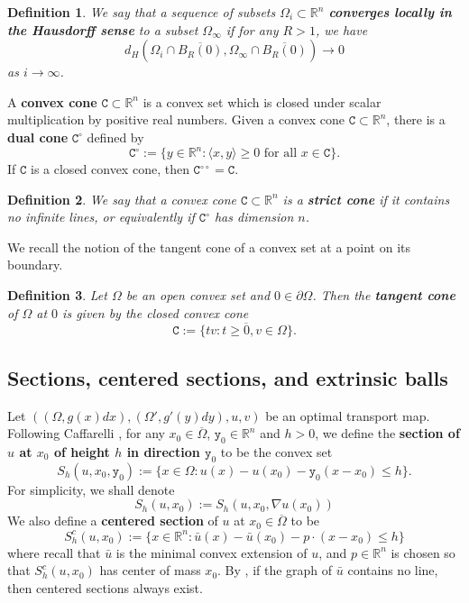 \documentclass[12pt,reqno]{amsart}
\newtheorem{defn}{Definition}[section]
\numberwithin{equation}{section}
\begin{document}
\begin{defn}
    We say that a sequence of subsets $\Omega_i\subset\mathbb R^n$ {\bf converges locally in the Hausdorff sense} to a subset $\Omega_{\infty}$ if for any $R>1$, we have \[d_H(\Omega_i\cap \overline{B_R(0)}, \Omega_\infty\cap \overline{B_R(0)})\to 0\] as $i\to \infty$. 
\end{defn}


A {\bf convex cone} $\mathtt C\subset \mathbb R^n$ is a convex set which is closed under scalar multiplication by positive real numbers. Given a convex cone $\mathtt C\subset \mathbb R^n$, there is a {\bf dual cone} $\mathtt C^{\circ}$ defined by
    \[\mathtt C^{\circ} :=\{y\in \mathbb R^n: \langle x, y\rangle\geq 0\text{ for all }x\in\mathtt C\}. \]
If $\mathtt C$ is a closed convex cone, then $\mathtt C^{\circ \circ} = \mathtt C$. 
\begin{defn}
    We say that a convex cone $\mathtt C\subset \mathbb R^n$ is a {\bf strict cone} if it contains no infinite lines, or equivalently if $\mathtt C^{\circ}$ has dimension $n$. 
\end{defn}

We recall the notion of the tangent cone of a convex set at a point on its boundary. 
\begin{defn}
    Let $\Omega$ be an open convex set and $0\in\partial\Omega$. Then the {\bf tangent cone} of $\Omega$ at $0$ is given by the closed convex cone
    \[\mathtt C:= \overline{\{tv: t\geq 0, v\in\Omega\}}. \]
\end{defn}

\subsection{Sections, centered sections, and extrinsic balls}
Let $((\Omega, g(x)dx), (\Omega', g'(y)dy), u, v)$ be an optimal transport map. Following Caffarelli \cite{Caffarelli}, for any $x_0\in \overline\Omega$, $\mathtt{y}_0\in\mathbb{R}^n$ and $h>0$, we define the {\bf section of $u$ at $x_0$ of height $h$ in direction $\mathtt{y}_0$} to be the convex set
\[S_h(u, x_0, \mathtt{y}_0) := \{x\in\Omega: u(x)-u(x_0)-\mathtt{y}_0(x-x_0)\leq h\}.\]
For simplicity, we shall denote
\[
S_{h}(u,x_0):= S_{h}(u,x_0, \nabla u(x_0))
\]
We also define a {\bf centered section} of $u$ at $x_0\in\overline\Omega$ to be
\[S^c_h(u, x_0) := \{x\in \mathbb R^n:\bar u(x)-\bar u(x_0)-p\cdot (x-x_0)\leq h\}\]
where recall that $\bar u$ is the minimal convex extension of $u$, and $p\in \mathbb R^n$ is chosen so that $S^c_h(u, x_0)$ has center of mass $x_0$. By \cite{Caffarelli2}, if the graph of $\bar u$ contains no line, then centered sections always exist. 
\end{document}
